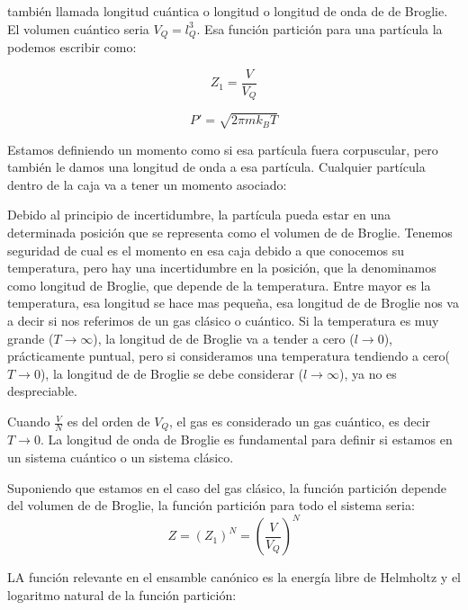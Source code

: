 \documentclass[11pt,fleqn]{book}
\begin{document}
también llamada longitud cuántica o longitud o longitud de onda de de Broglie. El volumen cuántico seria $V_{Q}=l_{Q}^{3}$. Esa función partición para una partícula la podemos escribir como:

\begin{equation}
    Z_{1}=\frac{V}{V_{Q}}
    \label{Eq. 4.71}
\end{equation}


\begin{equation}
        P'=\sqrt{2\pi mk_{B}T}
    \label{Eq. 4.72}
\end{equation}

Estamos definiendo un momento como si esa partícula fuera corpuscular, pero también le damos una longitud de onda a esa partícula. Cualquier partícula dentro de la caja va a tener un momento asociado:


Debido al principio de incertidumbre, la partícula pueda estar en una determinada posición que se representa como el volumen de de Broglie. Tenemos seguridad de cual es el momento en esa caja debido a que conocemos su temperatura, pero hay una incertidumbre en la posición, que la denominamos como longitud de Broglie, que depende de la temperatura. Entre mayor es la temperatura, esa longitud se hace mas pequeña, esa longitud de de Broglie nos va a decir si nos referimos de un gas clásico o cuántico. Si la temperatura es muy grande ($T\longrightarrow\infty$), la longitud de de Broglie va a tender a cero ($l\longrightarrow0$), prácticamente puntual, pero si consideramos una temperatura tendiendo a cero($T\longrightarrow0$), la longitud de de Broglie se debe considerar ($l\longrightarrow\infty$), ya no es despreciable. 



Cuando $\frac{V}{N}$ es del orden de $V_{Q}$, el gas es considerado un gas cuántico, es decir $T\longrightarrow0$. La longitud de onda de Broglie es fundamental para definir si estamos en un sistema cuántico o un sistema clásico.

Suponiendo que estamos en el caso del gas clásico, la función partición depende del volumen de de Broglie, la función partición para todo el sistema seria:
\begin{equation}
    Z=(Z_{1})^{N}=\left(\frac{V}{V_{Q}}\right)^{N}
    \label{Eq. 4.74}
\end{equation}

LA función relevante en el ensamble canónico es la energía libre de Helmholtz y el logaritmo natural de la función partición:
\end{document}
